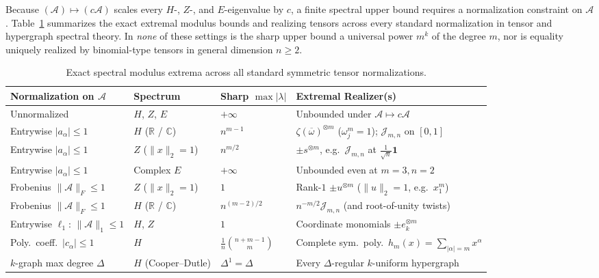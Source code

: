 \documentclass[11pt]{article}
\theoremstyle{definition}
\newcommand{\R}{\mathbb{R}}
\newcommand{\C}{\mathbb{C}}
\newcommand{\cA}{\mathcal{A}}
\newcommand{\cJ}{\mathcal{J}}
\begin{document}
Because $(\cA) \mapsto (c \cA)$ scales every $H$-, $Z$-, and $E$-eigenvalue by $c$, a finite
spectral upper bound requires a normalization constraint on $\cA$. Table~\ref{tab:summary}
summarizes the exact extremal modulus bounds and realizing tensors across every standard
normalization in tensor and hypergraph spectral theory. In \emph{none} of these settings is
the sharp upper bound a universal power $m^k$ of the degree $m$, nor is equality uniquely
realized by binomial-type tensors in general dimension $n \ge 2$.

\begin{table}[ht]
\centering
\small
\renewcommand{\arraystretch}{1.22}
\begin{tabular}{@{}llll@{}}
\toprule
\textbf{Normalization on $\cA$} & \textbf{Spectrum} & \textbf{Sharp $\max |\lambda|$} & \textbf{Extremal Realizer(s)} \\
\midrule
Unnormalized & $H$, $Z$, $E$ & $+\infty$ & Unbounded under $\cA \mapsto c\cA$ \\
Entrywise $|a_\alpha| \le 1$ & $H$ ($\R$ / $\C$) & $n^{m-1}$ & $\zeta (\overline{\omega})^{\otimes m}$ ($\omega_j^m = 1$); $\cJ_{m,n}$ on $[0,1]$ \\
Entrywise $|a_\alpha| \le 1$ & $Z$ ($\|x\|_2 = 1$) & $n^{m/2}$ & $\pm s^{\otimes m}$, e.g.\ $\cJ_{m,n}$ at $\frac{1}{\sqrt{n}}\mathbf{1}$ \\
Entrywise $|a_\alpha| \le 1$ & Complex $E$ & $+\infty$ & Unbounded even at $m=3, n=2$ \\
Frobenius $\|\cA\|_F \le 1$ & $Z$ ($\|x\|_2 = 1$) & $1$ & Rank-$1$ $\pm u^{\otimes m}$ ($\|u\|_2 = 1$, e.g.\ $x_1^m$) \\
Frobenius $\|\cA\|_F \le 1$ & $H$ ($\R$ / $\C$) & $n^{(m-2)/2}$ & $n^{-m/2}\cJ_{m,n}$ (and root-of-unity twists) \\
Entrywise $\ell_1$: $\|\cA\|_1 \le 1$ & $H$, $Z$ & $1$ & Coordinate monomials $\pm e_k^{\otimes m}$ \\
Poly.\ coeff.\ $|c_\alpha| \le 1$ & $H$ & $\frac{1}{n}\binom{n+m-1}{m}$ & Complete sym.\ poly.\ $h_m(x) = \sum_{|\alpha|=m} x^\alpha$ \\
$k$-graph max degree $\Delta$ & $H$ (Cooper--Dutle) & $\Delta^1 = \Delta$ & Every $\Delta$-regular $k$-uniform hypergraph \\
\bottomrule
\end{tabular}
\caption{Exact spectral modulus extrema across all standard symmetric tensor normalizations.}
\label{tab:summary}
\end{table}
\end{document}
